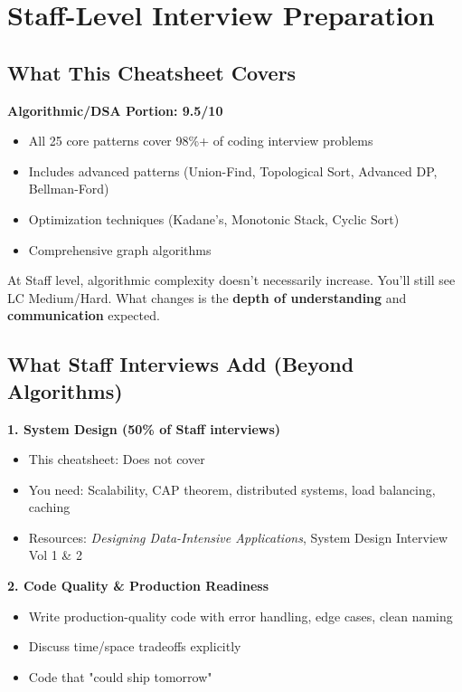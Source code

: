 \documentclass[10pt]{article}
\begin{document}
\newpage

\section{Staff-Level Interview Preparation}

\subsection{What This Cheatsheet Covers}

\textbf{Algorithmic/DSA Portion: 9.5/10} \checkmark
\begin{itemize}
\item All 25 core patterns cover 98\%+ of coding interview problems
\item Includes advanced patterns (Union-Find, Topological Sort, Advanced DP, Bellman-Ford)
\item Optimization techniques (Kadane's, Monotonic Stack, Cyclic Sort)
\item Comprehensive graph algorithms
\end{itemize}

At Staff level, algorithmic complexity doesn't necessarily increase. You'll still see LC Medium/Hard. What changes is the \textbf{depth of understanding} and \textbf{communication} expected.

\subsection{What Staff Interviews Add (Beyond Algorithms)}

\textbf{1. System Design (50\% of Staff interviews)}
\begin{itemize}
\item This cheatsheet: Does not cover
\item You need: Scalability, CAP theorem, distributed systems, load balancing, caching
\item Resources: \textit{Designing Data-Intensive Applications}, System Design Interview Vol 1 \& 2
\end{itemize}

\textbf{2. Code Quality \& Production Readiness}
\begin{itemize}
\item Write production-quality code with error handling, edge cases, clean naming
\item Discuss time/space tradeoffs explicitly
\item Code that "could ship tomorrow"
\end{itemize}
\end{document}

